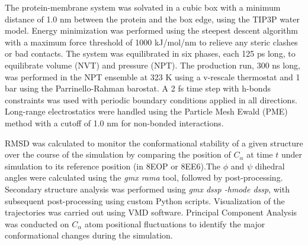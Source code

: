 The protein-membrane system was solvated in a cubic box with a minimum distance of 1.0 nm between the protein and the box edge, using the TIP3P water model. Energy minimization was performed using the steepest descent algorithm with a maximum force threshold of 1000 kJ/mol/nm to relieve any steric clashes or bad contacts. The system was equilibrated in six phases, each 125 ps long, to equilibrate volume (NVT) and pressure (NPT). The production run, 300 ns long, was performed in the NPT ensemble at 323 K using a v-rescale thermostat and 1 bar using the Parrinello-Rahman barostat. A 2 fs time step with h-bonds constraints was used with periodic boundary conditions applied in all directions. Long-range electrostatics were handled using the Particle Mesh Ewald (PME) method with a cutoff of 1.0 nm for non-bonded interactions. 
 
RMSD was calculated to monitor the conformational stability of a given structure over the course of the simulation by comparing the position of $C_\alpha$ at time $t$ under simulation to its reference position (in 8EOP or 8EE6).The $\phi$ and $\psi$ dihedral angles were calculated using the \textit{gmx rama} tool, followed by post-processing. Secondary structure analysis was performed using \textit{gmx dssp -hmode dssp}, with subsequent post-processing using custom Python scripts. Visualization of the trajectories was carried out using VMD software. Principal Component Analysis was conducted on $C_\alpha$ atom positional fluctuations  to identify the major conformational changes during the simulation. 

